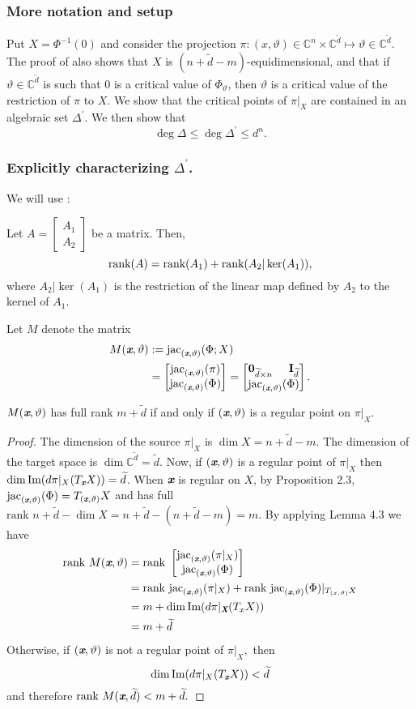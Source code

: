 \documentclass[sigconf]{acmart}
\def\Xb{\textit{\textbf{X}}}
\def\xb{\textit{\textbf{x}}}
\def\C{\mathbb{C}}
\def\vt{\vartheta}
\def\jac{ \textrm{jac}}
\def\rank{\textrm{rank}}
\def\dt{\widetilde{d}}
\def\rk{\textrm{rank }}
\def\bbm{\begin{bmatrix}}
\def\ebm{\end{bmatrix}}
\begin{document}
\subsubsection{More notation and setup}
%
Put $X = \Phi^{-1}(0)$ and consider the projection $\pi:(x, \vt) \in \C^n \times \C^{\dt} \mapsto \vt \in\C^{\dt}$. The proof of \cite[Theorem B.3]{NO} also shows that $X$ is $(n+ \dt -m)$-equidimensional, and that if $\vt \in \C^{\dt}$
is such that $0$ is a critical value of $\Phi_{\vt}$, then $\vt$ is a critical value of the restriction of $\pi$ to $X.$ We show that the critical points of $\pi|_X$ are contained in an algebraic set
$\Delta^{'}$. We then show that 
\[
\deg \Delta \leq \deg \Delta^{'} \leq d^n.
\] 
%
\subsubsection{Explicitly characterizing $\Delta^{'}$.} 
%
We will use \cite[Lemma B.4]{NO}:
\begin{lemma}
Let $A=\bbm A_1 \\ A_2 \ebm$ be a matrix. Then, 
\[ 
\textup{rank}(A) = 
\textup{rank}(A_1) + \textup{rank}(A_2|\ker(A_1)),
\]
where $A_2|\ker(A_1)$ is the restriction of the linear map defined by $A_2$ to the kernel of $A_1$. 
\end{lemma}
Let $M$ denote the matrix
%
\begin{align*}
M(\xb,\vt)&:= \jac_{(\xb,\vt)}(\Phi;X)\\
&= 
\bbm 
\jac_{(\xb,\vt)}(\pi)\\
\jac_{(\xb,\vt)}(\Phi) 
\ebm 
=
\bbm 
\textbf{0}_{\dt \times n}\hspace{5mm}\textbf{I}_{\dt} \\
\jac_{(\xb,\vt)}(\Phi)
\ebm.
\end{align*}
%
\begin{proposition} 
$M(\xb,\vt)$ has full rank $m+\dt$ if and only if $(\xb,\vt)$ is a regular point on $\pi|_X.$ 
\end{proposition}
%
\begin{proof}
The dimension of the source $\pi|_X$ is $\dim X = n + \dt - m.$ The dimension of the target space is $\dim \C^{\dt} = \dt.$ Now, if $(\xb,\vt)$ is a regular point of $\pi|_{X}$ then $\dim \textrm{Im}(d\pi|_X(T_{\xb}X)) = \dt$. When $\xb$ is regular on $X$, by Proposition 2.3, $\jac_{(\xb,\vt)} (\Phi) = T_{(\xb,\vt)}X$ and has full $\rk n + \dt - \dim X = n + \dt - (n + \dt - m) = m$. By applying Lemma 4.3 we have
%
\begin{align*}
\rank ~M(\xb,\vartheta) &= 
\rank ~
\bbm 
\jac_{(\xb,\vartheta)}(\pi|_X)\\
\jac_{(\xb,\vartheta)}(\Phi) 
\ebm \\
&= \rank~ \jac_{(\xb,\vartheta)}(\pi|_X) + \rank ~\jac_{(\xb,\vartheta)}(\Phi)|_{T_{(x,\vartheta)}X} \\
&= m + \dim \textrm{Im}(d\pi|_{\Xb}(T_xX)) \\
&= m + \dt 
\end{align*}
%
Otherwise, if $(\xb,\vt)$ is not a regular point of $\pi|_X,$ then \[\dim \textrm{Im}(d\pi|_X(T_{\xb}X)) < \dt\]  and therefore $\rank ~M(\xb,\dt) < m+\dt.$ 
\end{proof}
\end{document}
